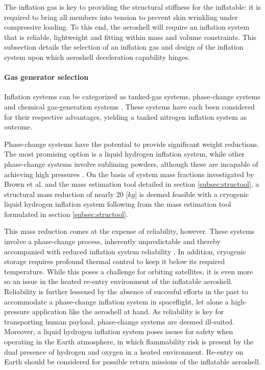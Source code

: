 The inflation gas is key to providing the structural stiffness for the inflatable: it is required to bring all members into tension to prevent skin wrinkling under compressive loading. To this end, the aeroshell will require an inflation system that is reliable, lightweight and fitting within mass and volume constraints. This subsection details the selection of an inflation gas and design of the inflation system upon which aeroshell deceleration capability hinges.

\paragraph{Gas generator selection}
Inflation systems can be categorized as tanked-gas systems, phase-change systems and chemical gas-generation systems \cite{Jenkins2001}. These systems have each been considered for their respective advantages, yielding a tanked nitrogen inflation system as outcome. 

Phase-change systems have the potential to provide significant weight reductions. The most promising option is a liquid hydrogen inflation system, while other phase-change systems involve subliming powders, although these are incapable of achieving high pressures \cite{Freeland1998}.  On the basis of system mass fractions investigated by Brown et al. \cite{Brown2009} and the mass estimation tool detailed in section \ref{subsec:structool}, a structural mass reduction of nearly 20 [$kg$] is deemed feasible with a cryogenic liquid hydrogen inflation system following from the mass estimation tool formulated in section \ref{subsec:structool}. 


This mass reduction comes at the expense of reliability, however. These systems involve a phase-change process, inherently unpredictable and thereby accompanied with reduced inflation system reliability \cite{Jenkins2001}. In addition, cryogenic storage requires profound thermal control to keep it below its required temperature. While this poses a challenge for orbiting satellites, it is even more so an issue in the heated re-entry environment of the inflatable aeroshell. Reliability is further lessened by the absence of succesful efforts in the past to accommodate a phase-change inflation system in spaceflight, let alone a high-pressure application like the aeroshell at hand. As reliability is key for transporting human payload, phase-change systems are deemed ill-suited. Moreover, a liquid hydrogen inflation system poses issues for safety when operating in the Earth atmosphere, in which flammability risk is present by the dual presence of hydrogen and oxygen in a heated environment. Re-entry on Earth should be considered for possible return missions of the inflatable aeroshell.

